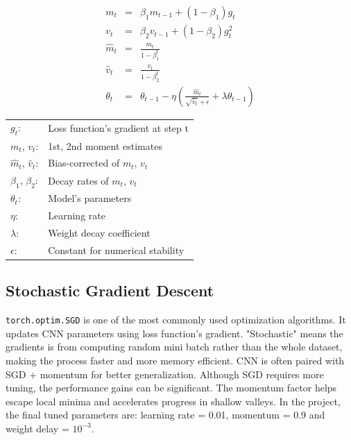 \documentclass{report}
\begin{document}
\[
\begin{array}{rcl}
    m_t       & = & \beta_1 m_{t-1} + (1 - \beta_1) g_t                                 \\ [0.2cm]
    v_t       & = & \beta_2 v_{t-1} + (1 - \beta_2) g_t^2                               \\ [0.2cm]
    \hat{m}_t & = & \frac{m_t}{1 - \beta_1^t}                                           \\ [0.2cm]
    \hat{v}_t & = & \frac{v_t}{1 - \beta_2^t}                                           \\ [0.2cm]
    \theta_t  & = & \theta_{t-1} - \eta \left( \frac{\hat{m}_t}{\sqrt{\hat{v}_t} 
                    + \epsilon} + \lambda \theta_{t-1} \right)                             
\end{array}
\]

\begin{center}
    \begin{tabular}{ll}
        $g_t$:                    & Loss function's gradient at step t  \\
        $m_t$, $v_t$:             & 1st, 2nd moment estimates           \\
        $\hat{m}_t$, $\hat{v}_t$: & Bias-corrected of $m_t$, $v_t$      \\
        $\beta_1$, $\beta_2$:     & Decay rates of $m_t$, $v_t$         \\
        $\theta_t$:               & Model's parameters                  \\
        $\eta$:                   & Learning rate                       \\
        $\lambda$:                & Weight decay coefficient            \\
        $\epsilon$:               & Constant for numerical stability    
    \end{tabular}   
\end{center}

\subsection{Stochastic Gradient Descent}
\texttt{torch.optim.SGD} is one of the most commonly used optimization algorithms. It updates CNN parameters
using loss function's gradient. "Stochastic" means the gradients is from computing random mini batch rather 
than the whole dataset, making the process faster and more memory efficient. CNN is often paired with SGD 
+ momentum for better generalization. Although SGD requires more tuning, the performance gains can be 
significant. The momentum factor helps escape local minima and accelerates progress in shallow valleys. In the 
project, the final tuned parameters are: learning rate = 0.01, momentum = 0.9 and weight delay = $10^{-3}$.
\end{document}
